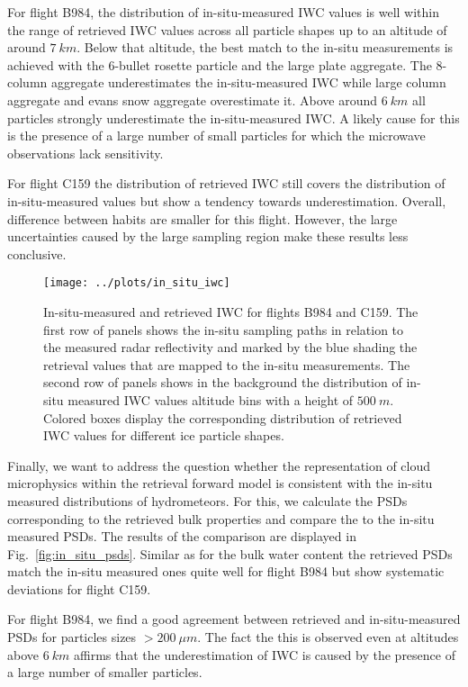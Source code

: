 \documentclass[journal abbreviation, manuscript]{copernicus}
\begin{document}
For flight B984, the distribution of in-situ-measured IWC values is well
within the range of retrieved IWC values across all particle shapes up
to an altitude of around $7\ \unit{km}$. Below that altitude, the best
match to the in-situ measurements is achieved with the 6-bullet rosette
particle and the large plate aggregate. The 8-column aggregate underestimates
the in-situ-measured IWC while large column aggregate and evans snow aggregate
overestimate it. Above around $6\ \unit{km}$ all particles strongly
underestimate the in-situ-measured IWC. A likely cause for this is the
presence of a large number of small particles for which the microwave
observations lack sensitivity.

For flight C159 the distribution of retrieved IWC still covers the distribution
of in-situ-measured values but show a tendency towards underestimation. Overall,
difference between habits are smaller for this flight. However, the large
uncertainties caused by the large sampling region make these results less
conclusive.

\begin{figure}[!hbpt]
  \centering
  \texttt{[image: ../plots/in\_situ\_iwc]}
  \caption{In-situ-measured and retrieved IWC for flights B984
    and C159. The first row of panels shows the in-situ sampling paths in
    relation to the measured radar reflectivity and marked by the
    blue shading the retrieval values that are mapped to the
    in-situ measurements. The second row of panels shows in the background
    the distribution of in-situ measured IWC values altitude bins with
    a height of $500\ \unit{m}$. Colored boxes display the corresponding
    distribution of retrieved IWC values for different ice particle shapes.}
  \label{fig:in_situ_iwc}
\end{figure}

Finally, we want to address the question whether the representation of cloud
microphysics within the retrieval forward model is consistent with the in-situ
measured distributions of hydrometeors. For this, we calculate the PSDs
corresponding to the retrieved bulk properties and compare the to the in-situ
measured PSDs. The results of the comparison are displayed in
Fig.~\ref{fig:in_situ_psds}. Similar as for the bulk water content the retrieved
PSDs match the in-situ measured ones quite well for flight B984 but show
systematic deviations for flight C159.

For flight B984, we find a good agreement between retrieved and in-situ-measured
PSDs for particles sizes $> 200 \ \unit{\mu m}$. The fact the this is observed
even at altitudes above $6 \ \unit{km}$ affirms that the underestimation of
IWC is caused by the presence of a large number of smaller particles.
\end{document}
